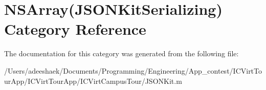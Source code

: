 \hypertarget{category_n_s_array_07_j_s_o_n_kit_serializing_08}{\section{N\-S\-Array(J\-S\-O\-N\-Kit\-Serializing) Category Reference}
\label{category_n_s_array_07_j_s_o_n_kit_serializing_08}
}


The documentation for this category was generated from the following file\-:\begin{DoxyCompactItemize}
\item 
/\-Users/adeeshaek/\-Documents/\-Programming/\-Engineering/\-App\-\_\-contest/\-I\-C\-Virt\-Tour\-App/\-I\-C\-Virt\-Tour\-App/\-I\-C\-Virt\-Campus\-Tour/J\-S\-O\-N\-Kit.\-m\end{DoxyCompactItemize}
